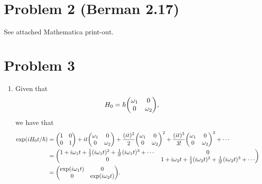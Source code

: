 \documentclass[12pt]{article}
\begin{document}
\section*{Problem 2 {\small (Berman 2.17)}}
See attached Mathematica print-out.

\section*{Problem 3}
\begin{enumerate}[label=(\alph*)]
    \item Given that
    \[ H_0 = \hbar\mqty(\omega_1&0\\0&\omega_2), \]
    we have that
    \begin{align*}
        \exp(iH_0t/\hbar) &= \mqty(1&0\\0&1) + it\mqty(\omega_1&0\\0&\omega_2) + \frac{(it)^2}{2}\mqty(\omega_1&0\\0&\omega_2)^2 + \frac{(it)^3}{3!}\mqty(\omega_1&0\\0&\omega_2)^3 + \cdots \\
        &= \mqty(1 + i\omega_1t + \frac{1}{2}(i\omega_1t)^2 + \frac{1}{3!}(i\omega_1 t)^3 + \cdots & 0 \\ 0 & 1 + i\omega_2t + \frac{1}{2}(i\omega_2t)^2 + \frac{1}{3!}(i\omega_2t)^3 + \cdots) \\
        &= \mqty(\exp(i\omega_1t)&0\\0&\exp(i\omega_2t)).
    \end{align*}


\end{enumerate}
\end{document}
